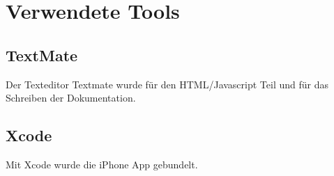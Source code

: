\newpage
\section{Verwendete Tools} %
\label{sec:Verwendete Tools}

\subsection{TextMate} %
\label{sub:TextMate}
Der Texteditor Textmate wurde für den HTML/Javascript Teil und für das Schreiben der Dokumentation.

\subsection{Xcode} %
\label{ssub:Xcode}
Mit Xcode wurde die iPhone App gebundelt.
